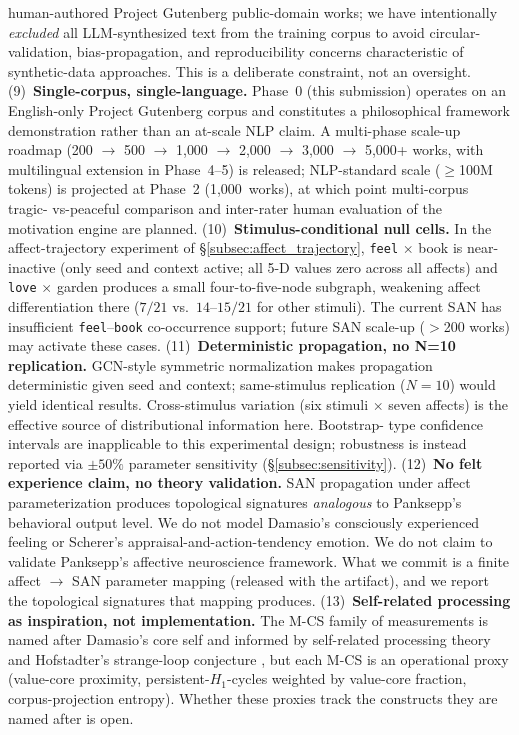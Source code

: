 \documentclass{article}
\begin{document}
human-authored Project Gutenberg public-domain works; we have intentionally
\emph{excluded} all LLM-synthesized text from the training corpus to avoid
circular-validation, bias-propagation, and reproducibility concerns
characteristic of synthetic-data approaches. This is a deliberate
constraint, not an oversight.
(9)~\textbf{Single-corpus, single-language.} Phase~0 (this submission)
operates on an English-only Project Gutenberg corpus and constitutes a
philosophical framework demonstration rather than an at-scale NLP claim.
A multi-phase scale-up roadmap (200 $\to$ 500 $\to$ 1{,}000 $\to$ 2{,}000
$\to$ 3{,}000 $\to$ 5{,}000+ works, with multilingual extension in
Phase~4--5) is released; NLP-standard scale ($\geq$100M tokens) is
projected at Phase~2 (1{,}000~works), at which point multi-corpus tragic-
vs-peaceful comparison and inter-rater human evaluation of the motivation
engine are planned.
(10)~\textbf{Stimulus-conditional null cells.} In the
affect-trajectory experiment of \S\ref{subsec:affect_trajectory},
\texttt{feel} $\times$ book is near-inactive (only seed and context
active; all 5-D values zero across all affects) and \texttt{love}
$\times$ garden produces a small four-to-five-node subgraph, weakening
affect differentiation there ($7/21$ vs.\ $14$--$15 / 21$ for other
stimuli). The current SAN has insufficient \texttt{feel}--\texttt{book}
co-occurrence support; future SAN scale-up ($>$200 works) may activate
these cases.
(11)~\textbf{Deterministic propagation, no N=10 replication.} GCN-style
symmetric normalization makes propagation deterministic given seed and
context; same-stimulus replication ($N{=}10$) would yield identical
results. Cross-stimulus variation (six stimuli $\times$ seven affects)
is the effective source of distributional information here. Bootstrap-
type confidence intervals are inapplicable to this experimental design;
robustness is instead reported via $\pm 50\%$ parameter sensitivity
(\S\ref{subsec:sensitivity}).
(12)~\textbf{No felt experience claim, no theory validation.} SAN
propagation under affect parameterization produces topological
signatures \emph{analogous} to Panksepp's behavioral output level. We do
not model Damasio's consciously experienced feeling
\cite{damasio1999feeling} or Scherer's appraisal-and-action-tendency
emotion. We do not claim to validate Panksepp's affective neuroscience
framework. What we commit is a finite affect $\to$ SAN parameter mapping
(released with the artifact), and we report the topological signatures
that mapping produces.
(13)~\textbf{Self-related processing as inspiration, not implementation.}
The M-CS family of measurements is named after Damasio's core self
\cite{damasio2010selfcomes} and informed by self-related processing
theory \cite{northoff2016self} and Hofstadter's strange-loop conjecture
\cite{hofstadter2007strange}, but each M-CS is an operational proxy
(value-core proximity, persistent-$H_1$-cycles weighted by value-core
fraction, corpus-projection entropy). Whether these proxies track the
constructs they are named after is open.
\end{document}
